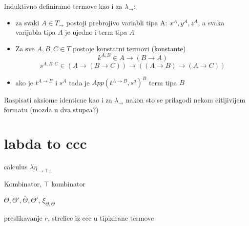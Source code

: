 \begin{definition}
  Induktivno definiramo termove kao i za $\lambda_\to$:
  \begin{itemize}
    \item za svaki $A \in T_\to$ postoji prebrojivo variabli tipa A: $x^A, y^A, z^A$, a svaka varijabla tipa $A$ je ujedno i term tipa $A$
    \item Za sve $A, B, C \in T$ postoje konstatni termovi (konstante)
      \begin{equation*}
        k^{A, B} \in A \to (B \to A)
      \end{equation*}
      \begin{equation*}
        s^{A, B, C} \in (A \to (B \to C)) \to ((A \to B) \to (A \to C))
      \end{equation*}
    \item ako je $t^{A \to B}$ i $s^A$ tada je $App(t^{A \to B}, s^a) ^B$ term tipa $B$
  \end{itemize}
\end{definition}


\begin{definition}
  Raspisati aksiome identicne kao i za $\lambda_\to$ nakon sto se prilagodi nekom citljivijem formatu (mozda u dva stupca?)
\end{definition}
\section{labda to ccc}

\begin{definition}
  calculus $\lambda \eta_{\to \top \bot}$
\end{definition}

\begin{definition}
  Kombinator, $\top$ kombinator
\end{definition}


\begin{definition}
  $\Theta, \Theta', \overline{\Theta}, $, $\xi_{\Theta, \Theta}$
\end{definition}

\begin{lema}
  preslikavanje $r$, strelice iz ccc u tipizirane termove
\end{lema}

